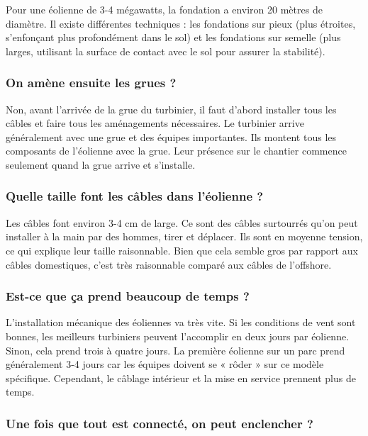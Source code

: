 Pour une éolienne de 3-4 mégawatts, la fondation a environ 20 mètres de diamètre. Il existe différentes techniques : les fondations sur pieux (plus étroites, s'enfonçant plus profondément dans le sol) et les fondations sur semelle (plus larges, utilisant la surface de contact avec le sol pour assurer la stabilité).

\subsubsection{On amène ensuite les grues ?}

Non, avant l'arrivée de la grue du turbinier, il faut d'abord installer tous les câbles et faire tous les aménagements nécessaires. Le turbinier arrive généralement avec une grue et des équipes importantes. Ils montent tous les composants de l'éolienne avec la grue. Leur présence sur le chantier commence seulement quand la grue arrive et s'installe.

\subsubsection{Quelle taille font les câbles dans l'éolienne ?}

Les câbles font environ 3-4 cm de large. Ce sont des câbles surtourrés qu'on peut installer à la main par des hommes, tirer et déplacer. Ils sont en moyenne tension, ce qui explique leur taille raisonnable. Bien que cela semble gros par rapport aux câbles domestiques, c'est très raisonnable comparé aux câbles de l'offshore.

\subsubsection{Est-ce que ça prend beaucoup de temps ?}

L'installation mécanique des éoliennes va très vite. Si les conditions de vent sont bonnes, les meilleurs turbiniers peuvent l'accomplir en deux jours par éolienne. Sinon, cela prend trois à quatre jours. La première éolienne sur un parc prend généralement 3-4 jours car les équipes doivent se « rôder » sur ce modèle spécifique. Cependant, le câblage intérieur et la mise en service prennent plus de temps.

\subsubsection{Une fois que tout est connecté, on peut enclencher ?}

